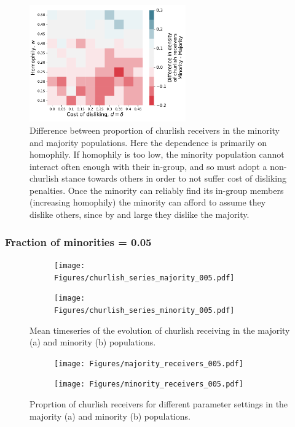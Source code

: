 \documentclass[11pt,letterpaper]{article}
\begin{document}
\begin{figure}[H]
  \centering
    \includegraphics[width=0.6\textwidth]{Figures/churlish_receivers_diff_025.pdf}
  \caption{Difference between proportion of churlish receivers in the minority 
    and majority populations. Here the dependence is primarily on homophily.
    If homophily is too low, the minority population cannot interact often
    enough with their in-group, and so must adopt a non-churlish stance towards
    others in order to not suffer cost of disliking penalties. Once the minority
    can reliably find its in-group members (increasing homophily) the minority
    can afford to assume they dislike others, since by and large they dislike
    the majority.
  }
  \label{fig:}
\end{figure}


\subsubsection{Fraction of minorities = 0.05}

\begin{figure}[H]
  \centering
  \begin{subfigure}{0.49\textwidth}
    \centering
    \texttt{[image: Figures/churlish\_series\_majority\_005.pdf]}
    \caption{}
    \label{fig:}
  \end{subfigure}
  \begin{subfigure}{0.49\textwidth}
    \centering
    \texttt{[image: Figures/churlish\_series\_minority\_005.pdf]}
    \caption{}
    \label{fig:}
  \end{subfigure}
  \caption{Mean timeseries of the evolution of churlish receiving in the
    majority (a) and minority (b) populations.}
  \label{fig:regressions}
\end{figure}


\begin{figure}[H]
  \centering
  \begin{subfigure}{0.49\textwidth}
    \centering
    \texttt{[image: Figures/majority\_receivers\_005.pdf]}
    \caption{}
    \label{fig:}
  \end{subfigure}
  \begin{subfigure}{0.49\textwidth}
    \centering
    \texttt{[image: Figures/minority\_receivers\_005.pdf]}
    \caption{}
    \label{fig:}
  \end{subfigure}
  \caption{Proprtion of churlish receivers for different parameter settings in the
    majority (a) and minority (b) populations.}
  \label{fig:regressions}
\end{figure}
\end{document}
